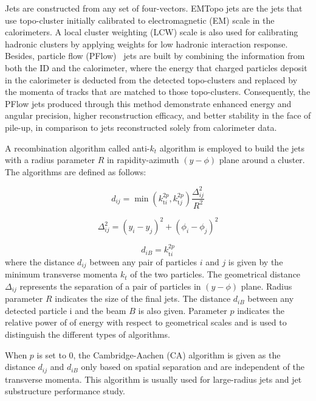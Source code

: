 Jets are constructed from any set of four-vectors. EMTopo jets are the jets that use topo-cluster initially calibrated to electromagnetic (EM) scale in the calorimeters. A local cluster weighting (LCW) scale is also used for calibrating hadronic clusters by applying weights for low hadronic interaction response. Besides, particle flow (PFlow)~\cite{PERF-2015-09} jets are built by combining the information from both the ID and the calorimeter, where the energy that charged particles deposit in the calorimeter is deducted from the detected topo-clusters and replaced by the momenta of tracks that are matched to those topo-clusters. Consequently, the PFlow jets produced through this method demonstrate enhanced energy and angular precision, higher reconstruction efficacy, and better stability in the face of pile-up, in comparison to jets reconstructed solely from calorimeter data.

A recombination algorithm called anti-$k_t$ algorithm is employed to build the jets with a radius parameter $R$ in rapidity-azimuth $(y-\phi)$ plane around a cluster. The algorithms are defined as follows:

\begin{equation}
d_{i j}=\min \left(k_{\mathrm{t} i}^{2 p}, k_{\mathrm{t} j}^{2 p}\right) \frac{\Delta_{i j}^2}{R^2}
\end{equation}

\begin{equation}
\Delta_{i j}^2=\left(y_i-y_j\right)^2+\left(\phi_i-\phi_j\right)^2
\end{equation}

\begin{equation}
d_{i B}=k_{\mathrm{t} i}^{2 p}
\end{equation}
where the distance $d_{i j}$ between any pair of particles $i$ and $j$ is given by the minimum transverse momenta $k_t$ of the two particles. The geometrical distance $\Delta_{i j}$ represents the separation of a pair of particles in $(y-\phi)$ plane. Radius parameter $R$ indicates the size of the final jets. The distance $d_{i B}$ between any detected particle i and the beam $B$ is also given. Parameter $p$ indicates the relative power of of energy with respect to geometrical scales and is used to distinguish the different types of algorithms.

When $p$ is set to 0,  the Cambridge-Aachen (CA) algorithm is given as the distance $d_{i j}$ and $d_{i B}$ only based on spatial separation and are independent of the transverse momenta. This algorithm is usually used for large-radius jets and jet substructure performance study.


